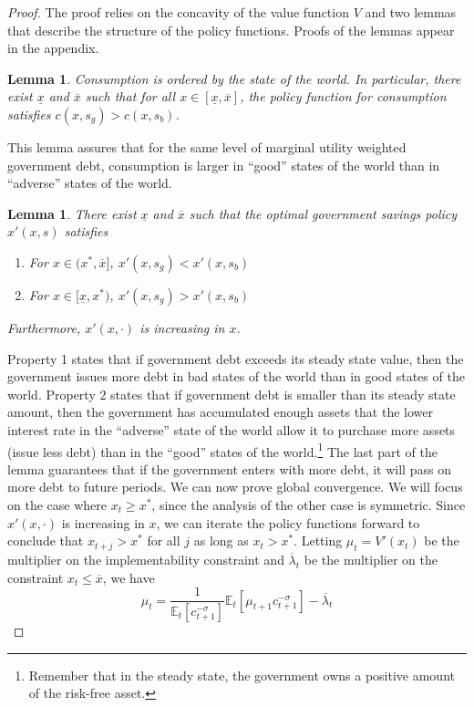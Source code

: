 \documentclass[12pt]{article}
\newcommand{\EE}{\mathbb E}
\newtheorem{lemma}[theorem]{Lemma}
\begin{document}
\begin{proof}  {The proof relies on the concavity of the value function $V$ and  two lemmas  that describe the structure of the policy functions.  Proofs of
 the lemmas appear in the appendix.
\begin{lemma}\label{lem:c_order}  Consumption is ordered by the state of the world.  In particular, there exist $\underline x$ and $\overline x$ such that for all $x\in[\underline x,\overline x]$, the policy function for consumption satisfies $c(x,s_g) > c(x,s_b)$.
\end{lemma}  This lemma assures that for the same level of marginal utility weighted government debt, consumption is larger in ``good'' states of the world than in ``adverse'' states of the world.
\begin{lemma}\label{lem:x_order}  There exist $\underline x$ and $\overline x$ such that the optimal government savings policy $x'(x,s)$ satisfies
\begin{enumerate}
	\item For $x\in(x^*,\overline x]$, $x'(x,s_g) < x'(x,s_b)$
	\item  For $x\in[\underline x, x^*)$, $x'(x,s_g) > x'(x,s_b)$
\end{enumerate}  Furthermore, $x'(x,\cdot)$ is increasing in $x$.
\end{lemma}  Property 1 states that if government debt exceeds its steady state value, then the government issues more debt in bad states of the world than in good states of the world.  Property 2 states that if government debt is smaller than its  steady state amount, then the government
has accumulated enough assets that
the lower interest rate in the ``adverse'' state of the world allow it to purchase more assets (issue less debt) than in the ``good'' states of the world.\footnote{Remember that  in the steady state, the government  owns a positive amount of the risk-free asset.}     The last part of the lemma guarantees that if the government enters with more debt, it will pass on more debt to future periods.  We can now prove global convergence. We will focus on the case where $x_t \geq x^*$, since the analysis of the other case is symmetric. Since $x'(x,\cdot)$ is increasing in $x$, we can iterate the policy functions forward to conclude that $x_{t+j} > x^*$ for all $j$ as long as $x_t >x ^*$.  Letting $\mu_t = V'(x_t)$ be the multiplier on the
implementability constraint and $\overline \lambda_t$ be the multiplier on the constraint $x_t \leq \overline x$, we have
\[
	 \mu_t = \frac{1}{\EE_t[c_{t+1}^{-\sigma}]}\EE_t[\mu_{t+1}c_{t+1}^{-\sigma}] -\overline \lambda_t
\]}
\end{proof}
\end{document}
